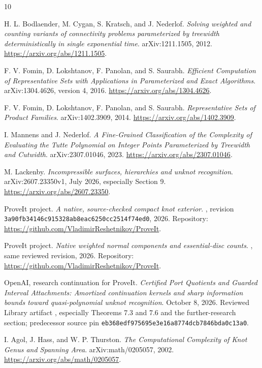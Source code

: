 \documentclass[11pt,a4paper]{article}
\theoremstyle{definition}
\theoremstyle{remark}
\begin{document}
\begin{thebibliography}{10}
\small\raggedright
\setlength{\itemsep}{1pt}
\setlength{\parsep}{0pt}
\setlength{\parskip}{0pt}
H. L. Bodlaender, M. Cygan, S. Kratsch, and J. Nederlof.
\emph{Solving weighted and counting variants of connectivity problems parameterized
by treewidth deterministically in single exponential time}.
arXiv:1211.1505, 2012. \url{https://arxiv.org/abs/1211.1505}.

F. V. Fomin, D. Lokshtanov, F. Panolan, and S. Saurabh.
\emph{Efficient Computation of Representative Sets with Applications in Parameterized
and Exact Algorithms}. arXiv:1304.4626, version 4, 2016.
\url{https://arxiv.org/abs/1304.4626}.

F. V. Fomin, D. Lokshtanov, F. Panolan, and S. Saurabh.
\emph{Representative Sets of Product Families}. arXiv:1402.3909, 2014.
\url{https://arxiv.org/abs/1402.3909}.

I. Mannens and J. Nederlof.
\emph{A Fine-Grained Classification of the Complexity of Evaluating the Tutte Polynomial
on Integer Points Parameterized by Treewidth and Cutwidth}.
arXiv:2307.01046, 2023. \url{https://arxiv.org/abs/2307.01046}.

M. Lackenby. \emph{Incompressible surfaces, hierarchies and unknot recognition}.
arXiv:2607.23350v1, July 2026, especially Section 9.
\url{https://arxiv.org/abs/2607.23350}.

ProveIt project. \emph{A native, source-checked compact knot exterior}.
,
revision \texttt{3a90fb34146c915328ab8eac6250cc2514f74ed0}, 2026.
Repository: \url{https://github.com/VladimirReshetnikov/ProveIt}.

ProveIt project. \emph{Native weighted normal components and essential-disc counts}.
,
same reviewed revision, 2026.
Repository: \url{https://github.com/VladimirReshetnikov/ProveIt}.

OpenAI, research continuation for ProveIt.
\emph{Certified Port Quotients and Guarded Interval Attachments:
Amortized continuation kernels and sharp information bounds toward
quasi-polynomial unknot recognition}. October 8, 2026.
Reviewed Library artifact , especially
Theorems 7.3 and 7.6 and the further-research section; predecessor source pin
\texttt{eb368edf975695e3e16a8774dcb7846bda0c13a0}.

I. Agol, J. Hass, and W. P. Thurston.
\emph{The Computational Complexity of Knot Genus and Spanning Area}.
arXiv:math/0205057, 2002. \url{https://arxiv.org/abs/math/0205057}.
\end{thebibliography}
\end{document}
